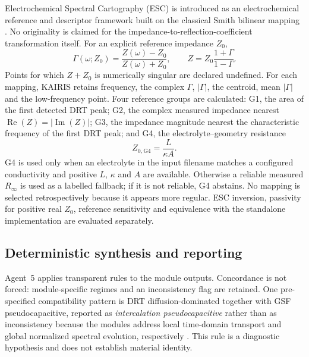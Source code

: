 \documentclass[a4paper,fleqn]{cas-sc}
\begin{document}
Electrochemical Spectral Cartography (ESC) is introduced as an electrochemical
reference and descriptor framework built on the classical Smith bilinear
mapping \cite{Smith1939Transmission,Siroma2025Graphing}. No originality is
claimed for the impedance-to-reflection-coefficient transformation itself.
For an explicit reference impedance $Z_0$,
\begin{equation}
 \Gamma(\omega;Z_0)=\frac{Z(\omega)-Z_0}{Z(\omega)+Z_0},
 \qquad
 Z=Z_0\frac{1+\Gamma}{1-\Gamma}.
 \label{eq:esc}
\end{equation}
Points for which $Z+Z_0$ is numerically singular are declared undefined. For
each mapping, KAIRIS retains frequency, the complex $\Gamma$, $|\Gamma|$, the
centroid, mean $|\Gamma|$ and the low-frequency point. Four reference groups are
calculated: G1, the area of the first detected DRT peak; G2, the complex measured
impedance nearest $\operatorname{Re}(Z)=|\operatorname{Im}(Z)|$; G3, the
impedance magnitude nearest the characteristic frequency of the first DRT peak;
and G4, the electrolyte--geometry resistance
\begin{equation}
 Z_{0,\mathrm{G4}}=\frac{L}{\kappa A}.
\end{equation}
G4 is used only when an electrolyte in the input filename matches a configured
conductivity and positive $L$, $\kappa$ and $A$ are available. Otherwise a
reliable measured $R_\infty$ is used as a labelled fallback; if it is not
reliable, G4 abstains. No mapping is selected retrospectively because it appears
more regular. ESC inversion, passivity for positive real $Z_0$, reference
sensitivity and equivalence with the standalone implementation are evaluated
separately.

\subsection{Deterministic synthesis and reporting}\label{sec:synthesis}

Agent~5 applies transparent rules to the module outputs. Concordance is not
forced: module-specific regimes and an inconsistency flag are retained. One
pre-specified compatibility pattern is DRT diffusion-dominated together with
GSF pseudocapacitive, reported as \emph{intercalation pseudocapacitive} rather
than as inconsistency because the modules address local time-domain transport
and global normalized spectral evolution, respectively
\cite{Augustyn2013Intercalation}. This rule is a diagnostic hypothesis and does
not establish material identity.
\end{document}
